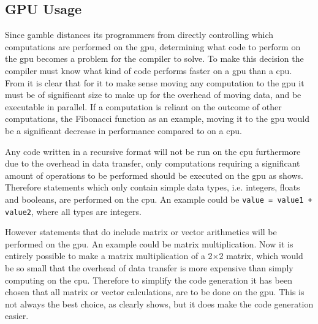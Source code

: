 \subsection*{GPU Usage}\label{GPUCode}
Since \gls{gamble} distances its programmers from directly controlling which computations are performed on the \acrshort{gpu}, determining what code to perform on the \acrshort{gpu} becomes a problem for the compiler to solve.
To make this decision the compiler must know what kind of code performs faster on a \acrshort{gpu} than a \acrshort{cpu}.
From  it is clear that for it to make sense moving any computation to the \acrshort{gpu} it must be of significant size to make up for the overhead of moving data, and be executable in parallel.
If a computation is reliant on the outcome of other computations, the Fibonacci function as an example, moving it to the \acrshort{gpu} would be a significant decrease in performance compared to on a \acrshort{cpu}.

Any code written in a recursive format will not be run on the \acrshort{cpu} furthermore due to the overhead in data transfer, only computations requiring a significant amount of operations to be performed should be executed on the \acrshort{gpu} as  shows.
Therefore statements which only contain simple data types, i.e. integers, floats and booleans, are performed on the \acrshort{cpu}.
An example could be \texttt{value = value1 + value2}, where all types are integers.

However statements that do include matrix or vector arithmetics will be performed on the \acrshort{gpu}.
An example could be matrix multiplication.
Now it is entirely possible to make a matrix multiplication of a 2$\times$2 matrix, which would be so small that the overhead of data transfer is more expensive than simply computing on the \acrshort{cpu}.
Therefore to simplify the code generation it has been chosen that all matrix or vector calculations, are to be done on the \acrshort{gpu}.
This is not always the best choice, as  clearly shows, but it does make the code generation easier.
